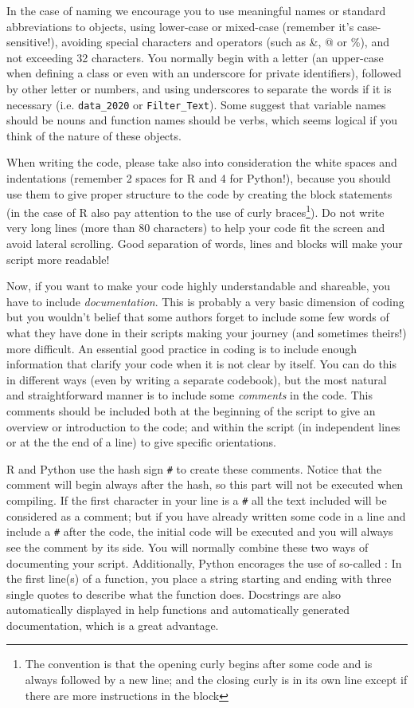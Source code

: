 In the case of naming we encourage you to use meaningful names or standard abbreviations to objects, using lower-case or mixed-case (remember it's case-sensitive!), avoiding special characters and operators (such as \&, @ or \%), and not exceeding 32 characters. You normally begin with a letter (an upper-case when defining a class or even with an underscore for private identifiers), followed by other letter or numbers, and using underscores to separate the words if it is necessary (i.e. \texttt{data\_2020} or \texttt{Filter\_Text}). Some suggest that variable names should be nouns and function names should be verbs, which seems logical if you think of the nature of these objects. 

When writing the code, please take also into consideration the white spaces and indentations (remember 2 spaces for R and 4 for Python!), because you should use them to give proper structure to the code by creating the block statements (in the case of R also pay attention to the use of curly braces\footnote{The convention is that the opening curly begins after some code and is always followed by a new line; and the closing curly is in its own line except if there are more instructions in the block}). Do not write very long lines (more than 80 characters) to help your code fit the screen and avoid lateral scrolling. Good separation of words, lines and blocks will make your script more readable!

Now, if you want to make your code highly understandable and shareable, you have to include \textit{documentation}. This is probably a very basic dimension of coding but you wouldn't belief that some authors forget to include some few words of what they have done in their scripts making your journey (and sometimes theirs!) more difficult. An essential good practice in coding is to include enough information that clarify your code when it is not clear by itself. You can do this in different ways (even by writing a separate codebook), but the most natural and straightforward manner is to include some  \textit{comments} in the code. This comments should be included both at the beginning of the script to give an overview or introduction to the code; and within the script (in independent lines or at the the end of a line) to give specific orientations. 

R and Python use the hash sign \texttt{\#} to create these comments. Notice that the comment will begin always after the hash, so this part will not be executed when compiling. If the first character in your line is  a \texttt{\#} all the text included will be considered as a comment; but if you have already written some code in a line and include a \texttt{\#} after the code, the initial code will be executed and you will always see the comment by its side. You will normally combine these two ways of documenting your script. Additionally, Python encorages the use of so-called : In the first line(s) of a function, you place a string starting and ending with three single quotes to describe what the function does. Docstrings are also automatically displayed in help functions and automatically generated documentation, which is a great advantage.

